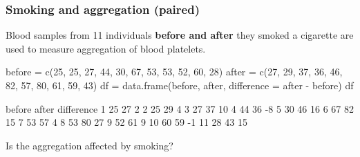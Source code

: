 \documentclass[a4paper]{article}
\begin{document}
\subsubsection{Smoking and aggregation (paired)}
Blood samples from 11 individuals \textbf{\textcolor{myred}{before and after}} they smoked a cigarette are used to measure aggregation of blood platelets.
\begin{Schunk}
\begin{Sinput}
before = c(25, 25, 27, 44, 30, 67, 53, 53, 52, 60, 28)
after =  c(27, 29, 37, 36, 46, 82, 57, 80, 61, 59, 43)
df = data.frame(before, after, difference = after - before)
df
\end{Sinput}
\begin{Soutput}
   before after difference
1      25    27          2
2      25    29          4
3      27    37         10
4      44    36         -8
5      30    46         16
6      67    82         15
7      53    57          4
8      53    80         27
9      52    61          9
10     60    59         -1
11     28    43         15
\end{Soutput}
\end{Schunk}
Is the aggregation affected by smoking?
\end{document}
